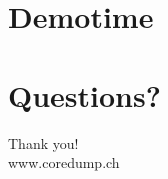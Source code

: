 \documentclass[aspectratio=1610,t]{beamer}
\begin{document}
{
\section{Demotime}
}



{
\section{Questions?}
}


{
\begin{frame}[standout]
	\begin{centering}
	{\Huge Thank you!}\\
	{\normalsize www.coredump.ch}
	\end{centering}
\end{frame}
}
\end{document}
